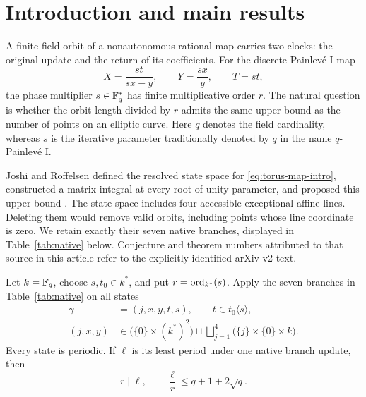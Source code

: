 \section{Introduction and main results}\label{sec:introduction}

A finite-field orbit of a nonautonomous rational map carries two clocks:
the original update and the return of its coefficients. For the discrete
Painlev\'e I map
\begin{equation}\label{eq:torus-map-intro}
X=\frac{st}{sx-y},\qquad Y=\frac{sx}{y},\qquad T=st,
\end{equation}
the phase multiplier \(s\in\mathbb F_q^*\) has finite multiplicative order
\(r\). The natural question is whether the orbit length divided by
\(r\) admits the same upper bound as the number of points on an
elliptic curve. Here \(q\) denotes the field cardinality, whereas
\(s\) is the iterative parameter traditionally denoted by \(q\) in
the name \(q\)-Painlev\'e I.

Joshi and Roffelsen defined the resolved state space for
\eqref{eq:torus-map-intro}, constructed a matrix integral at every
root-of-unity parameter, and proposed this upper bound
\citep{JoshiRoffelsen2026}. The state space includes four accessible
exceptional affine lines. Deleting them would remove valid orbits,
including points whose line coordinate is zero. We retain exactly their
seven native branches, displayed in Table~\ref{tab:native} below.
Conjecture and theorem numbers attributed to that source in this
article refer to the explicitly identified arXiv v2 text.

\begin{theorem}\label{thm:period}
Let \(k=\mathbb F_q\), choose \(s,t_0\in k^*\), and put
\(r=\operatorname{ord}_{k^*}(s)\). Apply the seven branches in
Table~\ref{tab:native} on all states
\begin{equation}\label{eq:state-domain-intro}
\begin{split}
\gamma&=(j,x,y,t,s),\qquad t\in t_0\langle s\rangle,\\
(j,x,y)&\in\bigl(\{0\}\times(k^*)^2\bigr)
\sqcup\bigsqcup_{j=1}^{4}\bigl(\{j\}\times\{0\}\times k\bigr).
\end{split}
\end{equation}
Every state is periodic. If \(\ell\) is its least period under one
native branch update, then
\begin{equation}\label{eq:main-bound}
r\mid\ell,\qquad \frac{\ell}{r}\le q+1+2\sqrt q.
\end{equation}
\end{theorem}

